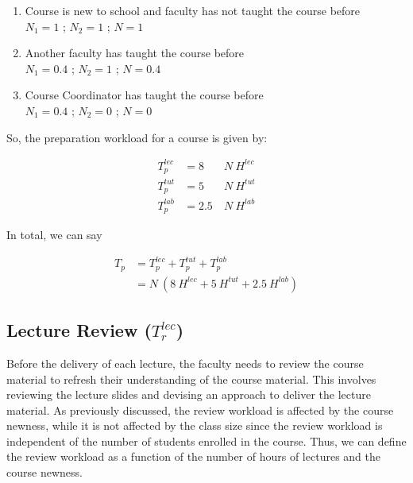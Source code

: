 \begin{enumerate}
  \item Course is new to school and faculty has not taught the course before       \\
        \(N_1 = 1\) ; \(N_2 = 1\) ; \(N = 1\)
  \item Another faculty has taught the course before \\
        \(N_1 = 0.4\) ; \(N_2 = 1\) ; \(N = 0.4\)
  \item Course Coordinator has taught the course before     \\
        \(N_1 = 0.4\) ; \(N_2 = 0\) ; \(N = 0\)
\end{enumerate}

So, the preparation workload for a course is given by:

\begin{equation}
  \begin{aligned}
    T_p^{lec} & = 8   & \ N \ H^{lec} \\
    T_p^{tut} & = 5   & \ N \ H^{tut} \\
    T_p^{lab} & = 2.5 & \ N \ H^{lab}
  \end{aligned}
\end{equation}

In total, we can say

\begin{equation}
  \label{eqn:preparation-workload-total}
  \begin{aligned}
    T_p & = T_p^{lec} + T_p^{tut} + T_p^{lab}           \\
        & = N\ (8\ H^{lec} + 5\ H^{tut} + 2.5\ H^{lab})
  \end{aligned}
\end{equation}

\subsection{Lecture Review (\texorpdfstring{\(T_r^{lec}\)}{})}

Before the delivery of each lecture, the faculty needs to review the course material to refresh their understanding of the course material. This involves reviewing the lecture slides and devising an approach to deliver the lecture material. As previously discussed, the review workload is affected by the course newness, while it is not affected by the class size since the review workload is independent of the number of students enrolled in the course. Thus, we can define the review workload as a function of the number of hours of lectures and the course newness.

